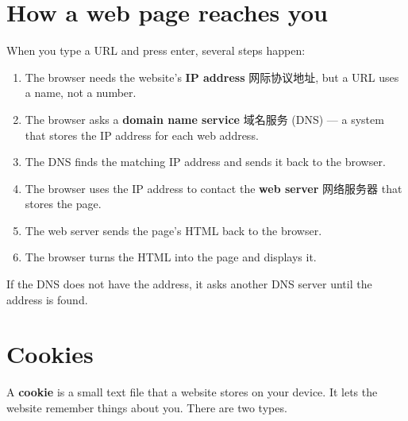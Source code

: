 \documentclass[11pt]{article}
\begin{document}
\section*{How a web page reaches you}

When you type a URL and press enter, several steps happen:

\begin{enumerate}
\item The browser needs the website's \textbf{IP address} 网际协议地址, but a URL uses a name, not a number.

\item The browser asks a \textbf{domain name service} 域名服务 (DNS) — a system that stores the IP address for each web address.

\item The DNS finds the matching IP address and sends it back to the browser.

\item The browser uses the IP address to contact the \textbf{web server} 网络服务器 that stores the page.

\item The web server sends the page's HTML back to the browser.

\item The browser turns the HTML into the page and displays it.

\end{enumerate}

If the DNS does not have the address, it asks another DNS server until the address is found.

\section*{Cookies}

A \textbf{cookie} is a small text file that a website stores on your device. It lets the website remember things about you. There are two types.

\begin{center}
\end{center}
\end{document}
